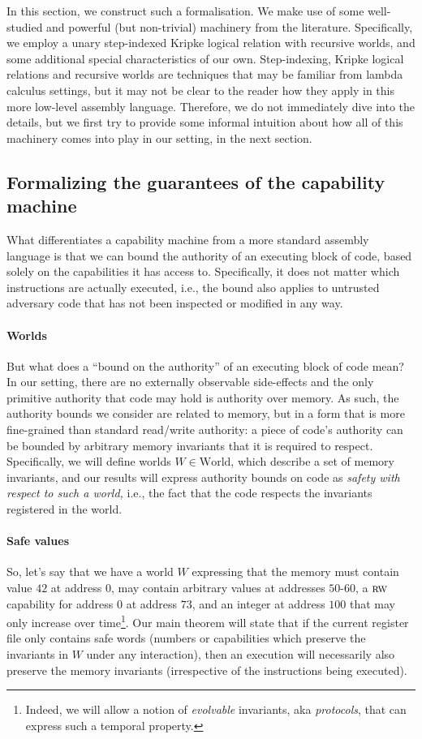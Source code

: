 \documentclass[acmsmall,review]{acmart}\settopmatter{printfolios=true}
\newcommand{\plaindom}[1]{\mathrm{#1}}
\newcommand{\Worlds}{\plaindom{World}}
\newcommand{\plainperm}[1]{\textsc{#1}}
\newcommand{\readwrite}{\plainperm{rw}}
\begin{document}
In this section, we construct such a formalisation. We make use of some
well-studied and powerful (but non-trivial) machinery from the literature.
Specifically, we employ a unary step-indexed Kripke logical relation with
recursive worlds, and some additional special characteristics of our own.
Step-indexing, Kripke logical relations and recursive worlds are techniques that
may be familiar from lambda calculus settings, but it may not be clear to the
reader how they apply in this more low-level assembly language. Therefore, we do
not immediately dive into the details, but we first try to provide some informal
intuition about how all of this machinery comes into play in our setting, in the
next section.

\subsection{Formalizing the guarantees of the capability machine}
\label{sec:formalizing-guarantees}
What differentiates a capability machine from a more standard assembly language
is that we can bound the authority of an executing block of code, based solely
on the capabilities it has access to. Specifically, it does not matter which
instructions are actually executed, i.e., the bound also applies to untrusted
adversary code that has not been inspected or modified in any way.

\paragraph{Worlds}
But what does a ``bound on the authority'' of an executing block of code mean?
In our setting, there are no externally observable side-effects and the only
primitive authority that code may hold is authority over memory. As such, the
authority bounds we consider are related to memory, but in a form that is more
fine-grained than standard read/write authority: a piece of code's authority can be bounded
by arbitrary memory invariants that it is required to respect. Specifically, we
will define worlds $W \in \Worlds$, which describe a set of memory invariants, and
our results will express authority bounds on code as \emph{safety with respect to such
a world,} i.e., the fact that the code respects the invariants registered in
the world.

\paragraph{Safe values}
So, let's say that we have a world $W$ expressing that the memory must contain
value $42$ at address $0$, may contain arbitrary values at
addresses $50$-$60$, a $\readwrite$ capability for address $0$ at address $73$, and
an integer at address $100$ that may only increase over time\footnote{Indeed, we
  will allow a notion of \emph{evolvable} invariants, aka \emph{protocols}, that can
  express such a temporal property.}. Our main theorem will state that if the
current register file only contains safe words (numbers or capabilities which
preserve the invariants in $W$ under any interaction), then an execution will
necessarily also preserve the memory invariants (irrespective of the instructions being
executed).
\end{document}
